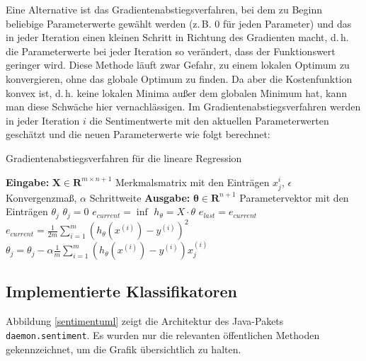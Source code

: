 Eine Alternative ist das Gradientenabstiegsverfahren, bei dem zu Beginn beliebige Parameterwerte gewählt werden (z.\,B. $0$ für jeden Parameter) und das in jeder Iteration einen kleinen Schritt in Richtung des Gradienten macht, d.\,h. die Parameterwerte bei jeder Iteration so verändert, dass der Funktionswert geringer wird. Diese Methode läuft zwar Gefahr, zu einem lokalen Optimum zu  konvergieren, ohne das globale Optimum zu finden. Da aber die Kostenfunktion konvex ist, d.\,h. keine lokalen Minima außer dem globalen Minimum hat, kann man diese Schwäche hier vernachlässigen. Im Gradientenabstiegsverfahren werden in jeder Iteration \( i \) die Sentimentwerte mit den aktuellen Parameterwerten geschätzt und die neuen Parameterwerte wie folgt berechnet:

\begin{algorithm}
 \caption{Gradientenabstiegsverfahren für die lineare Regression}\label{sentiment:gradientdescent}
\begin{algorithmic}[1]
\Statex \textbf{Eingabe:} $ \mathbf{X}\in \mathbf{R}^{m \times n + 1} $ Merkmalsmatrix mit den Einträgen $ x_{j}^{i} $, $ \epsilon $ Konvergenzmaß, $ \alpha $ Schrittweite
\Statex \textbf{Ausgabe:} $\mathbf{\theta}\in \mathbf{R}^{n + 1}$ Parametervektor mit den Einträgen \( \theta_{j} \)
\State $ \theta_j = 0 $
\EndFor
\State $ e_{current} = \inf $
\Repeat
\State $ h_{\theta} = X \cdot \theta $
\State $ e_{last} = e_{current} $
\State $ e_{current} = \frac{1}{2m} \sum_{i=1}^{m} (h_{\theta} (x^{(i)}) - y^{(i)})^2 $
\State $ \theta_j = \theta_j - \alpha \frac{1}{m} \sum_{i = 1}^{m} (h_{\theta} (x^{(i)}) - y^{(i)})x_j^{(i)} $
\EndFor
{}
\end{algorithmic}
\end{algorithm}

\subsection{Implementierte Klassifikatoren}
\label{subsec:sentimentimplementierung}

Abbildung \ref{sentimentuml} zeigt die Architektur des Java-Pakets \texttt{daemon.sentiment}. Es wurden nur die relevanten öffentlichen Methoden gekennzeichnet, um die Grafik übersichtlich zu halten.


